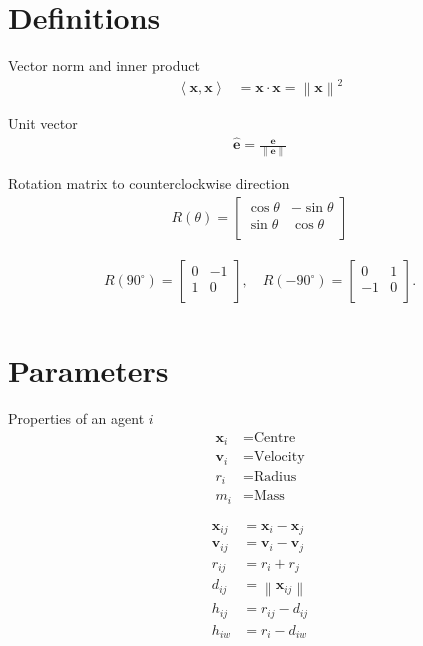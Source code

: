 \section{Definitions}

Vector norm and inner product
\begin{align}
\left\langle \mathbf{x}, \mathbf{x} \right\rangle &= \mathbf{x} \cdot \mathbf{x} = \left\| \mathbf{x}\right\|^{2}
\end{align}

Unit vector
\begin{align}
\hat{\mathbf{e}} = \frac{\mathbf{e}}{\left\|\mathbf{e}\right\|}
\end{align}

Rotation matrix to counterclockwise direction
\begin{align}
R(\theta) = \begin{bmatrix}\cos \theta & -\sin \theta \\\sin \theta & \cos \theta \\\end{bmatrix}
\end{align}

\begin{align}
R(90^{\circ}) = \begin{bmatrix}0 & -1 \\ 1 & 0 \\\end{bmatrix}, \quad R(-90^{\circ}) = \begin{bmatrix}0 & 1 \\ -1 & 0 \\\end{bmatrix}. \\
\end{align}

\section{Parameters}

Properties of an agent $ i $
\begin{align}
\mathbf{x}_{i} &= \text{Centre} \\
\mathbf{v}_{i} &= \text{Velocity} \\
r_{i} &= \text{Radius} \\
m_{i} &= \text{Mass}
\end{align}

\begin{align}
\mathbf{x}_{ij} &= \mathbf{x}_{i} - \mathbf{x}_{j} \\
\mathbf{v}_{ij} &= \mathbf{v}_{i} - \mathbf{v}_{j} \\
r_{ij} &= r_{i} + r_{j} \\
d_{ij} &= \left\|\mathbf{x}_{ij}\right\| \\
h_{ij} &= r_{ij} - d_{ij} \\
h_{iw} &= r_{i} - d_{iw}
\end{align}

